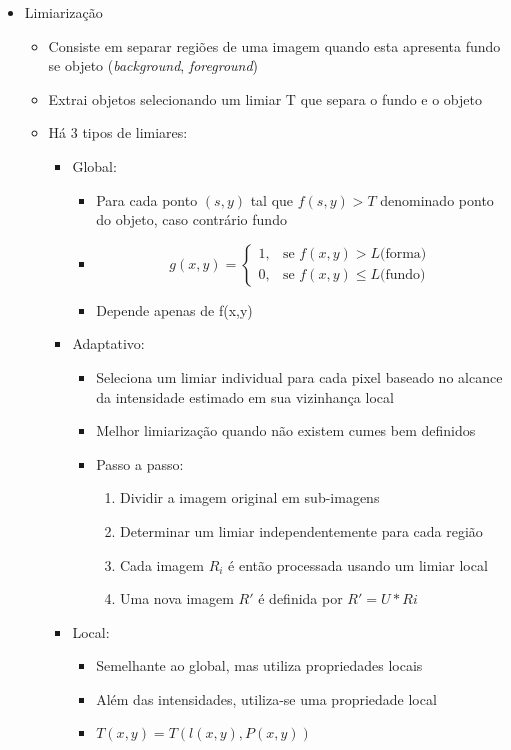 \documentclass{article}
\begin{document}
\begin{itemize}
    \item Limiarização
    \begin{itemize}
        \item Consiste em separar regiões de uma imagem quando esta apresenta fundo se objeto (\textit{background}, \textit{foreground}) 
        \item Extrai objetos selecionando um limiar T que separa o fundo e o objeto
        \item Há 3 tipos de limiares: 
        \begin{itemize}
            \item Global:
            \begin{itemize}
                \item Para cada ponto $(s,y)$ tal que $f(s,y) > T$ denominado ponto do objeto, caso contrário fundo 
                \item  $$g(x,y) = \left \{ \begin{matrix} 1, & \mbox{se }f(x,y)>L \mbox{(forma)} \\ 0, & \mbox{se }f(x,y) \le L \mbox{(fundo)} \end{matrix} \right.$$
                \item  Depende apenas de f(x,y)
            \end{itemize}
            \item Adaptativo:
            \begin{itemize}
                \item  Seleciona um limiar individual para cada pixel baseado no alcance da intensidade estimado em sua vizinhança local
                \item Melhor limiarização quando não existem cumes bem definidos
                \item  Passo a passo: 
                    \begin{enumerate}
                        \item Dividir a imagem original em sub-imagens 
                        \item Determinar um limiar independentemente para cada região 
                        \item Cada imagem $R_{i}$ é então processada usando um limiar local
                        \item Uma nova imagem $R'$ é definida por $R' = U * Ri$
                    \end{enumerate}  
            \end{itemize}
            \item Local:
            \begin{itemize}
                \item Semelhante ao global, mas utiliza propriedades locais 
                \item Além das intensidades, utiliza-se uma propriedade local
                \item $T(x,y)  = T(l(x,y), P(x,y))$
            \end{itemize}
        \end{itemize}
    \end{itemize}
\end{itemize}
\end{document}
